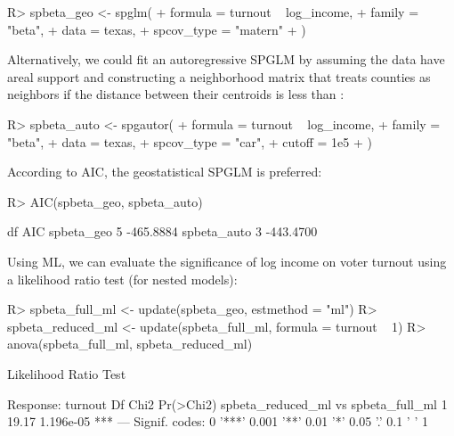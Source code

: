 \documentclass[
]{jss}
\begin{document}
\begin{CodeChunk}
\begin{CodeInput}
R> spbeta_geo <- spglm(
+    formula = turnout ~ log_income,
+    family = "beta", 
+    data = texas,
+    spcov_type = "matern"
+  )
\end{CodeInput}
\end{CodeChunk}

Alternatively, we could fit an autoregressive SPGLM by assuming the data
have areal support and constructing a neighborhood matrix that treats
counties as neighbors if the distance between their centroids is less
than :

\begin{CodeChunk}
\begin{CodeInput}
R> spbeta_auto <- spgautor(
+    formula = turnout ~ log_income,
+    family = "beta", 
+    data = texas,
+    spcov_type = "car",
+    cutoff = 1e5
+  )
\end{CodeInput}
\end{CodeChunk}

According to AIC, the geostatistical SPGLM is preferred:

\begin{CodeChunk}
\begin{CodeInput}
R> AIC(spbeta_geo, spbeta_auto)
\end{CodeInput}
\begin{CodeOutput}
            df       AIC
spbeta_geo   5 -465.8884
spbeta_auto  3 -443.4700
\end{CodeOutput}
\end{CodeChunk}

Using ML, we can evaluate the significance of log income on voter
turnout using a likelihood ratio test (for nested models):

\begin{CodeChunk}
\begin{CodeInput}
R> spbeta_full_ml <- update(spbeta_geo, estmethod = "ml")
R> spbeta_reduced_ml <- update(spbeta_full_ml, formula = turnout ~ 1)
R> anova(spbeta_full_ml, spbeta_reduced_ml)
\end{CodeInput}
\begin{CodeOutput}
Likelihood Ratio Test

Response: turnout
                                    Df  Chi2 Pr(>Chi2)    
spbeta_reduced_ml vs spbeta_full_ml  1 19.17 1.196e-05 ***
---
Signif. codes:  0 '***' 0.001 '**' 0.01 '*' 0.05 '.' 0.1 ' ' 1
\end{CodeOutput}
\end{CodeChunk}
\end{document}
